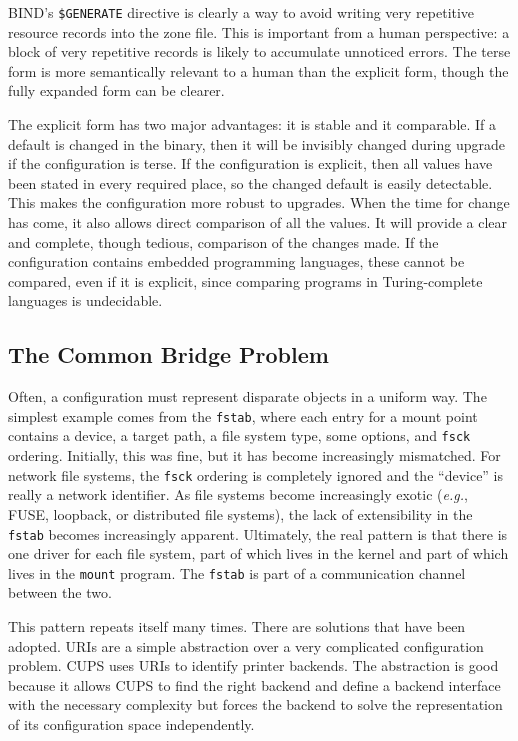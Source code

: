 \documentclass[letterpaper,twocolumn,10pt]{article}
\begin{document}
BIND's \texttt{\$GENERATE} directive is clearly a way to avoid writing very repetitive resource records into the zone file. This is important from a human perspective: a block of very repetitive records is likely to accumulate unnoticed errors. The terse form is more semantically relevant to a human than the explicit form, though the fully expanded form can be clearer.

The explicit form has two major advantages: it is stable and it comparable. If a default is changed in the binary, then it will be invisibly changed during upgrade if the configuration is terse. If the configuration is explicit, then all values have been stated in every required place, so the changed default is easily detectable. This makes the configuration more robust to upgrades. When the time for change has come, it also allows direct comparison of all the values. It will provide a clear and complete, though tedious, comparison of the changes made. If the configuration contains embedded programming languages, these cannot be compared, even if it is explicit, since comparing programs in Turing-complete languages is undecidable.

\subsection{The Common Bridge Problem}
Often, a configuration must represent disparate objects in a uniform way. The simplest example comes from the \texttt{fstab}, where each entry for a mount point contains a device, a target path, a file system type, some options, and \texttt{fsck} ordering.\cite{fstab} Initially, this was fine, but it has become increasingly mismatched. For network file systems, the \texttt{fsck} ordering is completely ignored and the ``device'' is really a network identifier. As file systems become increasingly exotic (\emph{e.g.}, FUSE, loopback, or distributed file systems), the lack of extensibility in the \texttt{fstab} becomes increasingly apparent. Ultimately, the real pattern is that there is one driver for each file system, part of which lives in the kernel and part of which lives in the \texttt{mount} program. The \texttt{fstab} is part of a communication channel between the two.

This pattern repeats itself many times. There are solutions that have been adopted. URIs are a simple abstraction over a very complicated configuration problem. CUPS uses URIs to identify printer backends. The abstraction is good because it allows CUPS to find the right backend and define a backend interface with the necessary complexity but forces the backend to solve the representation of its configuration space independently.
\end{document}
